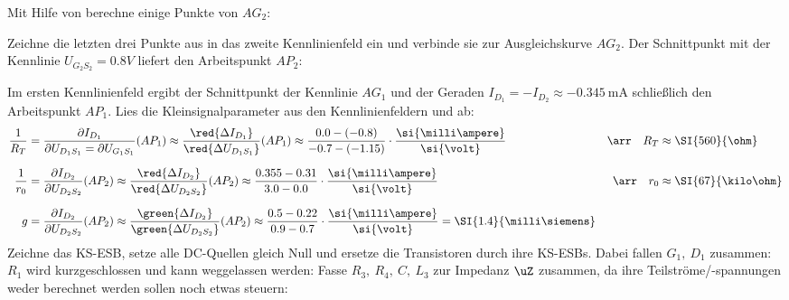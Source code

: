\documentclass[ngerman,10pt,a4paper]{article}%
\begin{document}
\noindent Mit Hilfe von  berechne einige Punkte von $AG_2$:

%

\noindent Zeichne die letzten drei Punkte aus  in das zweite Kennlinienfeld  ein und verbinde sie zur Ausgleichskurve $AG_2$. Der Schnittpunkt mit der Kennlinie $U_{G_2S_2}=0.8V$ liefert den Arbeitspunkt $AP_2$:
%

\noindent Im ersten Kennlinienfeld  ergibt der Schnittpunkt der Kennlinie $AG_1$ und der Geraden $I_{D_1}=-I_{D_2}\approx\SI{-0.345}{\milli\ampere}$ schließlich den Arbeitspunkt $AP_1$.
%
%
%
Lies die Kleinsignalparameter aus den Kennlinienfeldern  und  ab:
\begin{align*}%
	\frac{1}{R_T}&=\frac{%
		\partial I_{D_1}%
	}{%
		\partial U_{D_1S_1}=\partial U_{G_1S_1}%
	}(AP_1)\approx\frac{%
		\red{\Delta I_{D_1}}%
	}{%
		\red{\Delta U_{D_1S_1}}%
	}(AP_1)\approx\frac{%
		0.0-(-0.8)%
	}{%
		-0.7-(-1.15)%
	}\cdot\frac{%
		\si{\milli\ampere}%
	}{%
		\si{\volt}%
	}&\arr\quad R_T&\approx\SI{560}{\ohm}\\[2.5mm]%
%
	\frac{1}{r_0}&=\frac{%
		\partial I_{D_2}%
	}{%
		\partial U_{D_2S_2}%
	}(AP_2)\approx\frac{%
		\red{\Delta I_{D_2}}%
	}{%
		\red{\Delta U_{D_2S_2}}%
	}(AP_2)\approx\frac{%
		0.355-0.31%
	}{%
		3.0-0.0%
	}\cdot\frac{%
		\si{\milli\ampere}%
	}{%
		\si{\volt}%
	}&\arr\quad r_0&\approx\SI{67}{\kilo\ohm}\\[2.5mm]%
%
	g&=\frac{%
		\partial I_{D_2}%
	}{%
		\partial U_{D_2S_2}%
	}(AP_2)\approx\frac{%
		\green{\Delta I_{D_2}}%
	}{%
		\green{\Delta U_{D_2S_2}}%
	}(AP_2)\approx\frac{%
		0.5-0.22%
	}{%
		0.9-0.7%
	}\cdot\frac{%
		\si{\milli\ampere}%
	}{%
		\si{\volt}%
	}=\SI{1.4}{\milli\siemens}&&%
\end{align*}%
%
%
%
Zeichne das KS-ESB, setze alle DC-Quellen gleich Null und ersetze die Transistoren durch ihre KS-ESBs. Dabei fallen $G_1,\:D_1$ zusammen: $R_1$ wird kurzgeschlossen und kann weggelassen werden:
%
%
%
%
Fasse $R_3,\:R_4,\:C,\: L_3$ zur Impedanz $\uZ$ zusammen, da ihre Teilströme/-spannungen weder berechnet werden sollen noch etwas steuern:
\end{document}
